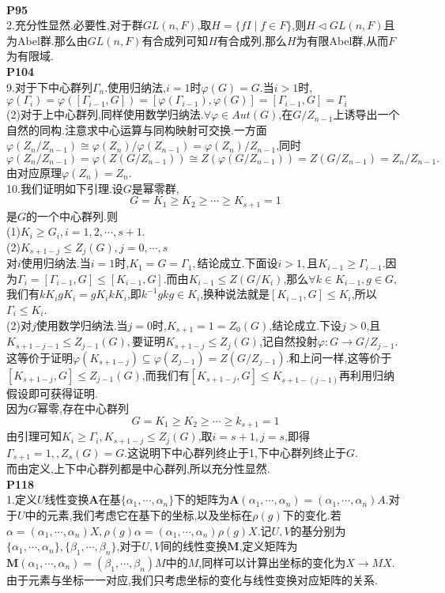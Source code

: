 \documentclass[b5paper,twoside]{ctexart}
\begin{document}
\pagestyle{plain}
\noindent\\
\textbf{P95}\\
2.充分性显然.必要性,对于群$GL(n,F)$,取$H=\{fI\mid f\in F\}$,则$H\lhd GL(n,F)$且为Abel群.那么由$GL(n,F)$有合成列可知$H$有合成列,那么$H$为有限Abel群,从而$F$为有限域.\\
\textbf{P104}\\
9.对于下中心群列$\Gamma_n$.使用归纳法,$i=1$时$\varphi(G)=G.$当$i>1$时,
$\varphi(\Gamma_i)=\varphi([\Gamma_{i-1},G])=[\varphi(\Gamma_{i-1}),\varphi(G)]=[\Gamma_{i-1},G]=\Gamma_i$\\
(2)对于上中心群列,同样使用数学归纳法.$\forall \varphi \in Aut(G)$,在$G/Z_{n-1}$上诱导出一个自然的同构.注意求中心运算与同构映射可交换.一方面$\varphi(Z_n/Z_{n-1})\cong\varphi(Z_n)/\varphi(Z_{n-1})=\varphi(Z_n)/Z_{n-1}$,同时
$\varphi(Z_n/Z_{n-1})=\varphi(Z(G/Z_{n-1}))\cong Z(\varphi(G/Z_{n-1}))= Z(G/Z_{n-1})=Z_n/Z_{n-1}.$由对应原理$\varphi(Z_n)=Z_n$.\\
10.我们证明如下引理.设$G$是幂零群,
\[G=K_1\geq K_2\geq \cdots \geq K_{s+1}=1\]
是$G$的一个中心群列.则\\
(1)$K_i\geq G_i,i=1,2,\cdots,s+1$.\\
(2)$K_{s+1-j}\leq Z_j(G),j=0,\cdots,s$\\
对$i$使用归纳法.当$i=1$时,$K_1=G=\Gamma_1,$结论成立.下面设$i>1,$且$K_{i-1}\geq \Gamma_{i-1}$.因为$\Gamma_i=[\Gamma_{i-1},G]\leq [K_{i-1},G]$.而由$K_{i-1}\leq Z(G/K_i)$,那么$\forall k\in K_{i-1},g\in G$,我们有$kK_igK_i=gK_ikK_i$,即$k^{-1}gkg\in K_i$,换种说法就是$[K_{i-1},G]\leq K_i$,所以$\Gamma_i\leq K_i$.\\
(2)对$j$使用数学归纳法.当$j=0$时,$K_{s+1}=1=Z_0(G)$,结论成立.下设$j>0$,且$K_{s+1-{j-1}}\leq Z_{j-1}(G),$要证明$K_{s+1-j}\leq Z_{j}(G)$,记自然投射$\varphi:G\to G/Z_{j-1}$.这等价于证明$\varphi(K_{s+1-j})\subseteq \varphi(Z_{j-1})=Z(G/Z_{j-1})$.和上问一样,这等价于$[K_{s+1-j},G]\leq Z_{j-1}(G)$,而我们有$[K_{s+1-j},G]\leq K_{s+1-(j-1)}$再利用归纳假设即可获得证明.\\
因为$G$幂零,存在中心群列
\[G=K_1\geq K_2\geq \cdots \geq k_{s+1}=1\]
由引理可知$K_i\geq \Gamma_i,K_{s+1-j}\leq Z_j(G)$,取$i=s+1,j=s$,即得$\Gamma_{s+1}=1,,Z_s(G)=G.$这说明下中心群列终止于1,下中心群列终止于$G$.\\
而由定义,上下中心群列都是中心群列,所以充分性显然.\\
\textbf{P118}\\
1.定义$U$线性变换$\mathbf{A}$在基$\{\alpha_1,\cdots,\alpha_n\}$下的矩阵为$\mathbf{A}(\alpha_1,\cdots,\alpha_n)=(\alpha_1,\cdots,\alpha_n)A$.对于$U$中的元素,我们考虑它在基下的坐标,以及坐标在$\rho(g)$下的变化.若$\alpha=(\alpha_1,\cdots,\alpha_n)X,\rho(g)\alpha=(\alpha_1,\cdots,\alpha_n)\rho(g)X$.记$U,V$的基分别为$\{\alpha_1,\cdots,\alpha_n\},\{\beta_1,\cdots,\beta_n\}$,对于$U,V$间的线性变换$\mathbf{M}$,定义矩阵为$\mathbf{M}(\alpha_1,\cdots,\alpha_n)=(\beta_1,\cdots,\beta_n)M$中的$M$,同样可以计算出坐标的变化为$X\to MX$.由于元素与坐标一一对应,我们只考虑坐标的变化与线性变换对应矩阵的关系.\\
\end{document}
